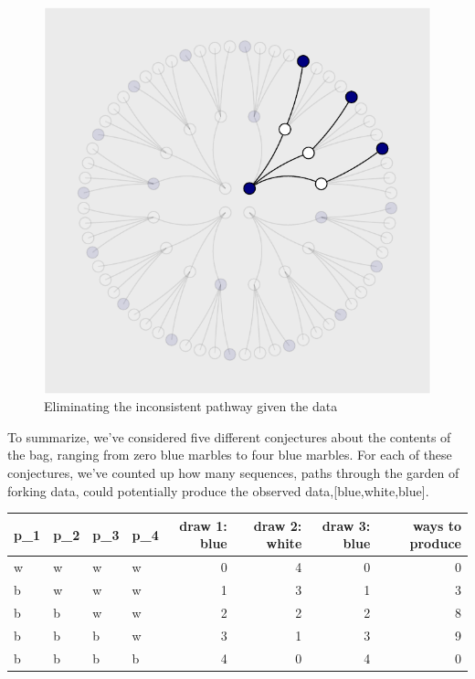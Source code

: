 \documentclass{article}
\begin{document}
\begin{figure}

{\centering \includegraphics{qrap_paper_files/figure-latex/unnamed-chunk-1-1} 

}

\caption{Eliminating the inconsistent pathway given the data}\label{fig:unnamed-chunk-1}
\end{figure}

To summarize, we've considered five different conjectures about the
contents of the bag, ranging from zero blue marbles to four blue
marbles. For each of these conjectures, we've counted up how many
sequences, paths through the garden of forking data, could potentially
produce the observed data,{[}blue,white,blue{]}.

\begin{table}
\centering
\begin{tabular}{l|l|l|l|r|r|r|r}
\hline
p\_1 & p\_2 & p\_3 & p\_4 & draw 1: blue & draw 2: white & draw 3: blue & ways to produce\\
\hline
w & w & w & w & 0 & 4 & 0 & 0\\
\hline
b & w & w & w & 1 & 3 & 1 & 3\\
\hline
b & b & w & w & 2 & 2 & 2 & 8\\
\hline
b & b & b & w & 3 & 1 & 3 & 9\\
\hline
b & b & b & b & 4 & 0 & 4 & 0\\
\hline
\end{tabular}
\end{table}
\end{document}
